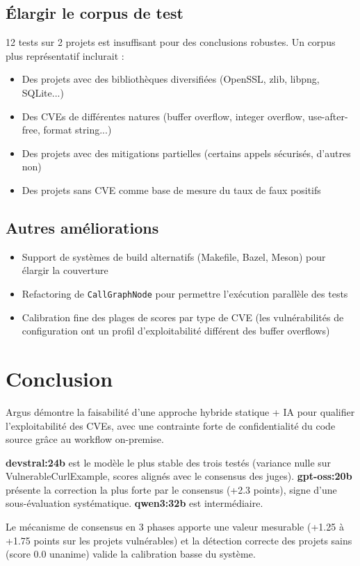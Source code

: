 \documentclass[a4paper, 12pt, hidelinks]{article}
\begin{document}
\subsection*{Élargir le corpus de test}

12 tests sur 2 projets est insuffisant pour des conclusions robustes. Un corpus plus représentatif inclurait :
\begin{itemize}
  \item Des projets avec des bibliothèques diversifiées (OpenSSL, zlib, libpng, SQLite...)
  \item Des CVEs de différentes natures (buffer overflow, integer overflow, use-after-free, format string...)
  \item Des projets avec des mitigations partielles (certains appels sécurisés, d'autres non)
  \item Des projets sans CVE comme base de mesure du taux de faux positifs
\end{itemize}

\subsection*{Autres améliorations}

\begin{itemize}
  \item Support de systèmes de build alternatifs (Makefile, Bazel, Meson) pour élargir la couverture
  \item Refactoring de \texttt{CallGraphNode} pour permettre l'exécution parallèle des tests
  \item Calibration fine des plages de scores par type de CVE (les vulnérabilités de configuration ont un profil d'exploitabilité différent des buffer overflows)
\end{itemize}

\section{Conclusion}

Argus démontre la faisabilité d'une approche hybride statique + IA pour qualifier l'exploitabilité des CVEs, avec une contrainte forte de confidentialité du code source grâce au workflow on-premise.

\textbf{devstral:24b} est le modèle le plus stable des trois testés (variance nulle sur VulnerableCurlExample, scores alignés avec le consensus des juges). \textbf{gpt-oss:20b} présente la correction la plus forte par le consensus (+2.3 points), signe d'une sous-évaluation systématique. \textbf{qwen3:32b} est intermédiaire.

Le mécanisme de consensus en 3 phases apporte une valeur mesurable (+1.25 à +1.75 points sur les projets vulnérables) et la détection correcte des projets sains (score 0.0 unanime) valide la calibration basse du système.
\end{document}
